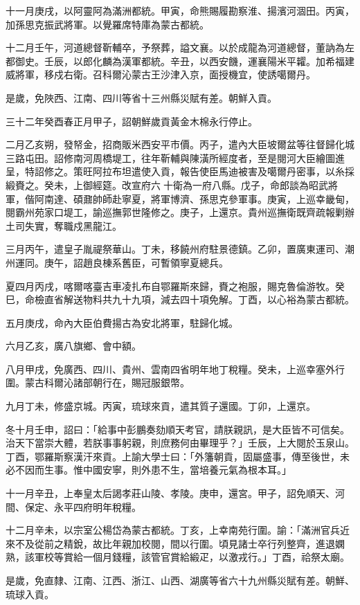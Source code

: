\begin{pinyinscope}
十一月庚戌，以阿靈阿為滿洲都統。甲寅，命熊賜履勘察淮、揚濱河涸田。丙寅，加孫思克振武將軍。以覺羅席特庫為蒙古都統。

十二月壬午，河道總督靳輔卒，予祭葬，謚文襄。以於成龍為河道總督，董訥為左都御史。壬辰，以郎化麟為漢軍都統。辛丑，以西安饑，運襄陽米平糶。加希福建威將軍，移戍右衛。召科爾沁蒙古王沙津入京，面授機宜，使誘噶爾丹。

是歲，免陜西、江南、四川等省十三州縣災賦有差。朝鮮入貢。

三十二年癸酉春正月甲子，詔朝鮮歲貢黃金木棉永行停止。

二月乙亥朔，發帑金，招商販米西安平市價。丙子，遣內大臣坡爾盆等往督歸化城三路屯田。詔修南河周橋堤工，往年靳輔與陳潢所經度者，至是閱河大臣繪圖進呈，特詔修之。策旺阿拉布坦遣使入貢，報告使臣馬迪被害及噶爾丹密事，以糸採緞賚之。癸未，上御經筵。改宣府六十衛為一府八縣。戊子，命郎談為昭武將軍，偕阿南達、碩鼐帥師赴寧夏，將軍博濟、孫思克參軍事。庚寅，上巡幸畿甸，閱霸州苑家口堤工，諭巡撫郭世隆修之。庚子，上還京。貴州巡撫衛既齊疏報剿辦土司失實，奪職戍黑龍江。

三月丙午，遣皇子胤禔祭華山。丁未，移饒州府駐景德鎮。乙卯，置廣東運司、潮州運同。庚午，詔趙良棟系舊臣，可暫領寧夏總兵。

夏四月丙戌，喀爾喀臺吉車凌扎布自鄂羅斯來歸，賚之袍服，賜克魯倫游牧。癸巳，命檢直省解送物料共九十九項，減去四十項免解。丁酉，以心裕為蒙古都統。

五月庚戌，命內大臣伯費揚古為安北將軍，駐歸化城。

六月乙亥，廣八旗鄉、會中額。

八月甲戌，免廣西、四川、貴州、雲南四省明年地丁稅糧。癸未，上巡幸塞外行圍。蒙古科爾沁諸部朝行在，賜冠服銀幣。

九月丁未，修盛京城。丙寅，琉球來貢，遣其質子還國。丁卯，上還京。

冬十月壬申，詔曰：「給事中彭鵬奏劾順天考官，請朕親訊，是大臣皆不可信矣。治天下當崇大體，若朕事事躬親，則庶務何由畢理乎？」壬辰，上大閱於玉泉山。丁酉，鄂羅斯察漢汗來貢。上諭大學士曰：「外籓朝貢，固屬盛事，傳至後世，未必不因而生事。惟中國安寧，則外患不生，當培養元氣為根本耳。」

十一月辛丑，上奉皇太后謁孝莊山陵、孝陵。庚申，還宮。甲子，詔免順天、河間、保定、永平四府明年稅糧。

十二月辛未，以宗室公楊岱為蒙古都統。丁亥，上幸南苑行圍。諭：「滿洲官兵近來不及從前之精銳，故比年親加校閱，間以行圍。頃見諸士卒行列整齊，進退嫻熟，該軍校等賞給一個月錢糧，該管官賞給緞疋，以激戎行。」丁酉，祫祭太廟。

是歲，免直隸、江南、江西、浙江、山西、湖廣等省六十九州縣災賦有差。朝鮮、琉球入貢。


\end{pinyinscope}
